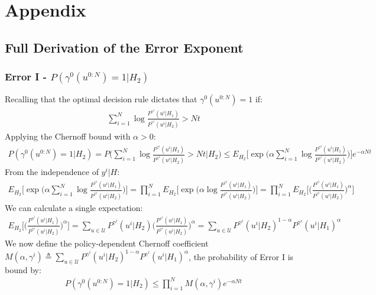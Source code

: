 \documentclass[11pt]{article}
\begin{document}
\newpage

\section{Appendix}
\subsection{Full Derivation of the Error Exponent}
\label{app:error-exponent}
\subsubsection*{Error I - $P(\gamma^0(u^{0:N}) = 1|H_2)$}
Recalling that the optimal decision rule dictates that $\gamma^0(u^{0:N}) = 1$ if:
\begin{align}
    \sum_{i=1}^{N}\log\frac{P^{\gamma^i}(u^i|H_1)}{P^{\gamma^i}(u^i|H_2)} > Nt
\end{align}
Applying the Chernoff bound with $\alpha > 0$:
\begin{align}
    P(\gamma^0(u^{0:N}) = 1|H_2) = P\bigg(\sum_{i=1}^{N}\log\frac{P^{\gamma^i}(u^i|H_1)}{P^{\gamma^i}(u^i|H_2)} > Nt\bigg|H_2\bigg) \leq E_{H_2}\bigg[\exp\bigg(\alpha \sum_{i=1}^{N}\log\frac{P^{\gamma^i}(u^i|H_1)}{P^{\gamma^i}(u^i|H_2)}\bigg)\bigg]e^{-\alpha Nt}
\end{align}
From the independence of $y^i|H$:
\begin{align}
    E_{H_2}\bigg[\exp\bigg(\alpha \sum_{i=1}^{N}\log\frac{P^{\gamma^i}(u^i|H_1)}{P^{\gamma^i}(u^i|H_2)}\bigg)\bigg] = \prod_{i=1}^{N}E_{H_2}\bigg[\exp\bigg(\alpha \log\frac{P^{\gamma^i}(u^i|H_1)}{P^{\gamma^i}(u^i|H_2)}\bigg)\bigg] = \prod_{i=1}^{N}E_{H_2}\bigg[\bigg(\frac{P^{\gamma^i}(u^i|H_1)}{P^{\gamma^i}(u^i|H_2)}\bigg)^\alpha\bigg]
\end{align}
We can calculate a single expectation:
\begin{align}
    E_{H_2}\bigg[\bigg(\frac{P^{\gamma^i}(u^i|H_1)}{P^{\gamma^i}(u^i|H_2)}\bigg)^\alpha\bigg] = \sum_{u \in \mathcal{U}} P^{\gamma^i}(u^i|H_2)\bigg(\frac{P^{\gamma^i}(u^i|H_1)}{P^{\gamma^i}(u^i|H_2)}\bigg)^\alpha = \sum_{u \in \mathcal{U}} P^{\gamma^i}(u^i|H_2)^{1-\alpha}P^{\gamma^i}(u^i|H_1)^{\alpha}
\end{align}
We now define the policy-dependent Chernoff coefficient $M(\alpha,\gamma^i) \triangleq \sum_{u \in \mathcal{U}} P^{\gamma^i}(u^i|H_2)^{1-\alpha}P^{\gamma^i}(u^i|H_1)^{\alpha}$, the probability of Error I is bound by:
\begin{align}
    P(\gamma^0(u^{0:N}) = 1|H_2) \leq \prod_{i=1}^{N}M(\alpha,\gamma^i)e^{-\alpha Nt}
\end{align}
\end{document}
